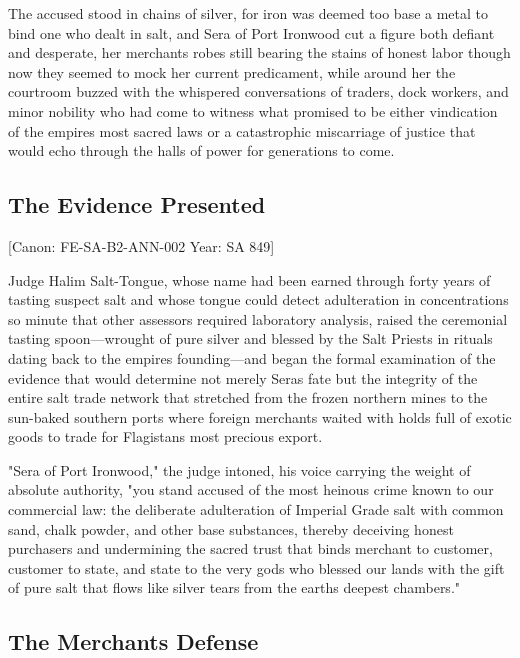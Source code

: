 The accused stood in chains of silver, for iron was deemed too base a
metal to bind one who dealt in salt, and Sera of Port Ironwood cut a
figure both defiant and desperate, her merchant\textquotesingle s robes
still bearing the stains of honest labor though now they seemed to mock
her current predicament, while around her the courtroom buzzed with the
whispered conversations of traders, dock workers, and minor nobility who
had come to witness what promised to be either vindication of the
empire\textquotesingle s most sacred laws or a catastrophic miscarriage
of justice that would echo through the halls of power for generations to
come.

\subsection{The Evidence Presented}\label{the-evidence-presented}

{[}Canon: FE-SA-B2-ANN-002 \textbar{} Year: SA 849{]}

Judge Halim Salt-Tongue, whose name had been earned through forty years
of tasting suspect salt and whose tongue could detect adulteration in
concentrations so minute that other assessors required laboratory
analysis, raised the ceremonial tasting spoon---wrought of pure silver
and blessed by the Salt Priests in rituals dating back to the
empire\textquotesingle s founding---and began the formal examination of
the evidence that would determine not merely Sera\textquotesingle s fate
but the integrity of the entire salt trade network that stretched from
the frozen northern mines to the sun-baked southern ports where foreign
merchants waited with holds full of exotic goods to trade for
Flagistan\textquotesingle s most precious export.

"Sera of Port Ironwood," the judge intoned, his voice carrying the
weight of absolute authority, "you stand accused of the most heinous
crime known to our commercial law: the deliberate adulteration of
Imperial Grade salt with common sand, chalk powder, and other base
substances, thereby deceiving honest purchasers and undermining the
sacred trust that binds merchant to customer, customer to state, and
state to the very gods who blessed our lands with the gift of pure salt
that flows like silver tears from the earth\textquotesingle s deepest
chambers."

\subsection{The Merchant\textquotesingle s
Defense}\label{the-merchants-defense}

